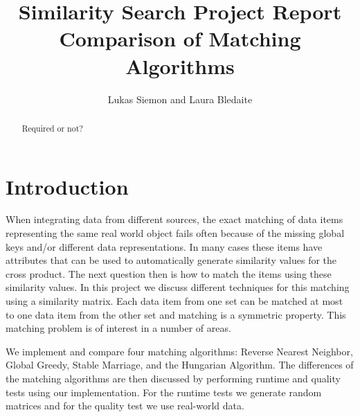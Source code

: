 \documentclass[a4paper,11pt]{article}
\newcommand\etc{\textsl{etc}}
\begin{document}
\title{
  \textbf{\large Similarity Search Project Report}\\
  Comparison of Matching Algorithms
}

\author{Lukas Siemon and Laura Bledaite}
\maketitle

\begin{abstract}
Required or not?
\end{abstract}

\section{Introduction}

When integrating data from different sources, the exact matching of data items representing the same real world object fails often because of the missing global keys and/or different data representations. In many cases these items have attributes that can be used to automatically generate similarity values for the cross product. The next question then is how to match the items using these similarity values. In this project we discuss different techniques for this matching using a similarity matrix. Each data item from one set can be matched at most to one data item from the other set and matching is a symmetric property. This matching problem is of interest in a number of areas.

We implement and compare four matching algorithms: Reverse Nearest Neighbor, Global Greedy, Stable Marriage, and the Hungarian Algorithm. 
The differences of the matching algorithms are then discussed by performing runtime and quality tests using our implementation. For the runtime tests we generate random matrices and for the quality test we use real-world data.

 
\end{document}
